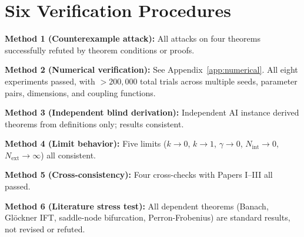 \documentclass[12pt,a4paper]{article}
\theoremstyle{definition}
\newcommand{\Nint}{N_{\mathrm{int}}}
\newcommand{\Next}{N_{\mathrm{ext}}}
\begin{document}
\section{Six Verification Procedures}
\label{app:verification}

\textbf{Method 1 (Counterexample attack):} All attacks on four theorems successfully refuted by theorem conditions or proofs.

\textbf{Method 2 (Numerical verification):} See Appendix~\ref{app:numerical}. All eight experiments passed, with $> 200{,}000$ total trials across multiple seeds, parameter pairs, dimensions, and coupling functions.

\textbf{Method 3 (Independent blind derivation):} Independent AI instance derived theorems from definitions only; results consistent.

\textbf{Method 4 (Limit behavior):} Five limits ($k \to 0$, $k \to 1$, $\gamma \to 0$, $\Nint \to 0$, $\Next \to \infty$) all consistent.

\textbf{Method 5 (Cross-consistency):} Four cross-checks with Papers I--III all passed.

\textbf{Method 6 (Literature stress test):} All dependent theorems (Banach, Gl\"ockner IFT, saddle-node bifurcation, Perron-Frobenius) are standard results, not revised or refuted.
\end{document}
